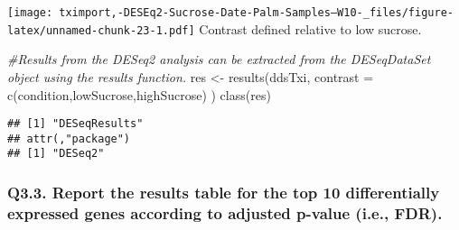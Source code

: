 \documentclass[
]{article}
\newenvironment{Shaded}{\begin{snugshade}}{\end{snugshade}}
\newcommand{\AttributeTok}[1]{\textcolor[rgb]{0.77,0.63,0.00}{#1}}
\newcommand{\CommentTok}[1]{\textcolor[rgb]{0.56,0.35,0.01}{\textit{#1}}}
\newcommand{\DecValTok}[1]{\textcolor[rgb]{0.00,0.00,0.81}{#1}}
\newcommand{\FunctionTok}[1]{\textcolor[rgb]{0.00,0.00,0.00}{#1}}
\newcommand{\NormalTok}[1]{#1}
\newcommand{\OtherTok}[1]{\textcolor[rgb]{0.56,0.35,0.01}{#1}}
\newcommand{\SpecialCharTok}[1]{\textcolor[rgb]{0.00,0.00,0.00}{#1}}
\newcommand{\StringTok}[1]{\textcolor[rgb]{0.31,0.60,0.02}{#1}}
\begin{document}
\texttt{[image: tximport,-DESEq2-Sucrose-Date-Palm-Samples--W10-\_files/figure-latex/unnamed-chunk-23-1.pdf]}
Contrast defined relative to low sucrose.

\begin{Shaded}
\begin{Highlighting}[]
\CommentTok{\#Results from the DESeq2 analysis can be extracted from the DESeqDataSet object using the results function.}
\NormalTok{res }\OtherTok{\textless{}{-}} \FunctionTok{results}\NormalTok{(ddsTxi, }\AttributeTok{contrast =} \FunctionTok{c}\NormalTok{(}\StringTok{\textquotesingle{}condition\textquotesingle{}}\NormalTok{,}\StringTok{\textquotesingle{}lowSucrose\textquotesingle{}}\NormalTok{,}\StringTok{\textquotesingle{}highSucrose\textquotesingle{}}\NormalTok{) )}
\FunctionTok{class}\NormalTok{(res) }
\end{Highlighting}
\end{Shaded}

\begin{verbatim}
## [1] "DESeqResults"
## attr(,"package")
## [1] "DESeq2"
\end{verbatim}

\hypertarget{q3.3.-report-the-results-table-for-the-top-10-differentially-expressed-genes-according-to-adjusted-p-value-i.e.-fdr.}{%
\subsubsection{Q3.3. Report the results table for the top 10
differentially expressed genes according to adjusted p-value (i.e.,
FDR).}\label{q3.3.-report-the-results-table-for-the-top-10-differentially-expressed-genes-according-to-adjusted-p-value-i.e.-fdr.}}

\begin{Shaded}
\end{Shaded}
\end{document}
